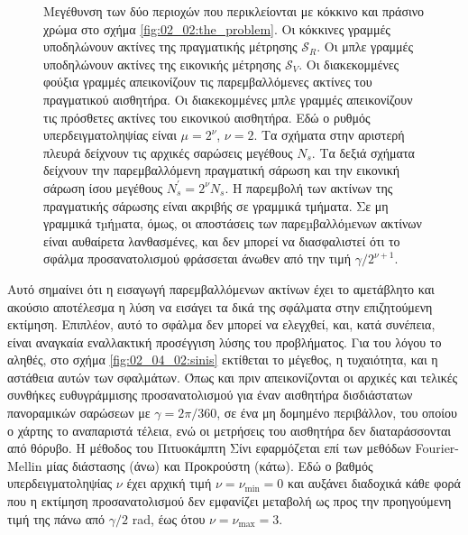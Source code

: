 \begin{figure}[!h]\centering
  \vspace{0.5cm}
  
  \vspace{1.0cm}
  \caption{\small Μεγέθυνση των δύο περιοχών που περικλείονται με κόκκινο
           και πράσινο χρώμα στο σχήμα \ref{fig:02_02:the_problem}. Οι κόκκινες
           γραμμές υποδηλώνουν ακτίνες της πραγματικής μέτρησης $\mathcal{S}_R$.
           Oι μπλε γραμμές υποδηλώνουν ακτίνες της εικονικής μέτρησης $\mathcal{S}_V$.
           Οι διακεκομμένες φούξια γραμμές απεικονίζουν τις παρεμβαλλόμενες
           ακτίνες του πραγματικού αισθητήρα. Οι διακεκομμένες μπλε γραμμές
           απεικονίζουν τις πρόσθετες ακτίνες του εικονικού αισθητήρα.
           Εδώ ο ρυθμός υπερδειγματοληψίας είναι $\mu = 2^\nu$, $\nu = 2$.
           Τα σχήματα στην αριστερή πλευρά δείχνουν τις αρχικές σαρώσεις
           μεγέθους $N_s$. Τα δεξιά σχήματα δείχνουν την παρεμβαλλόμενη
           πραγματική σάρωση και την εικονική σάρωση ίσου μεγέθους $N_s^\prime
           = 2^\nu N_s$. Η παρεμβολή των ακτίνων της πραγματικής σάρωσης είναι
           ακριβής σε γραμμικά τμήματα. Σε μη γραμμικά τµήµατα, όμως, οι
           αποστάσεις των παρεµβαλλόµενων ακτίνων είναι αυθαίρετα λανθασμένες,
           και δεν μπορεί να διασφαλιστεί ότι το σφάλμα προσανατολισμού
           φράσσεται άνωθεν από την τιμή $\gamma/2^{\nu+1}$. }
  \label{fig:oversampling_goes_wrong}
\end{figure}

Αυτό σημαίνει ότι η εισαγωγή παρεμβαλλόμενων ακτίνων έχει το αμετάβλητο και
ακούσιο αποτέλεσμα η λύση να εισάγει τα δικά της σφάλματα στην επιζητούμενη
εκτίμηση. Επιπλέον, αυτό το σφάλμα δεν μπορεί να ελεγχθεί, και, κατά συνέπεια,
είναι αναγκαία εναλλακτική προσέγγιση λύσης του προβλήματος. Για του λόγου το
αληθές, στο σχήμα \ref{fig:02_04_02:sinis} εκτίθεται το μέγεθος, η τυχαιότητα,
και η αστάθεια αυτών των σφαλμάτων. Όπως και πριν απεικονίζονται οι αρχικές και
τελικές συνθήκες ευθυγράμμισης προσανατολισμού για έναν αισθητήρα δισδιάστατων
πανοραμικών σαρώσεων με $\gamma = 2\pi/360$, σε ένα μη δομημένο περιβάλλον, του
οποίου ο χάρτης το αναπαριστά τέλεια, ενώ οι μετρήσεις του αισθητήρα δεν
διαταράσσονται από θόρυβο. H μέθοδος του Πιτυοκάμπτη Σίνι εφαρμόζεται επί των
μεθόδων Fourier-Mellin μίας διάστασης (άνω) και Προκρούστη (κάτω). Εδώ ο βαθμός
υπερδειγματοληψίας $\nu$ έχει αρχική τιμή $\nu = \nu_{\min} = 0$ και αυξάνει
διαδοχικά κάθε φορά που η εκτίμηση προσανατολισμού δεν εμφανίζει μεταβολή ως
προς την προηγούμενη τιμή της πάνω από $\gamma/2$ rad, έως ότου $\nu =
\nu_{\max} = 3$.

